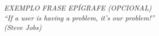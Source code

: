 \begin{epigrafe}
    \vspace*{\fill}
	\begin{flushright}
		\textit{EXEMPLO FRASE EPÍGRAFE (OPCIONAL) \\ ``If a user is having a problem, it's our problem!''\\ 
		        (Steve Jobs)}
	\end{flushright}
\end{epigrafe}
